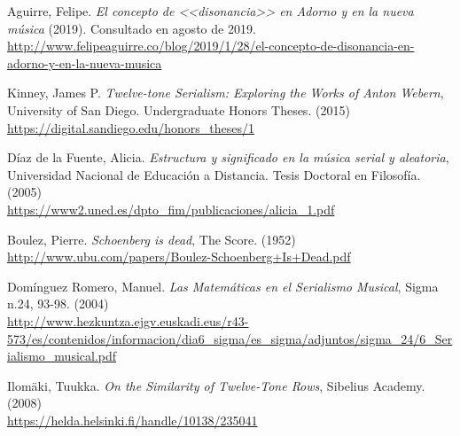 \renewcommand\refname{Referencias}
	\begin{thebibliography}{00}
			

			{ Aguirre, Felipe.} 
			\textit{El concepto de <<disonancia>> en Adorno y en la nueva música} (2019). Consultado en agosto de 2019.
			\\\url{http://www.felipeaguirre.co/blog/2019/1/28/el-concepto-de-disonancia-en-adorno-y-en-la-nueva-musica}
			
			{ Kinney, James P.} 
			\textit{Twelve-tone Serialism: Exploring the Works of Anton Webern},
			University of San Diego.
			Undergraduate Honors Theses.
			(2015)
			\\\url{https://digital.sandiego.edu/honors_theses/1}
			
			{ Díaz de la Fuente, Alicia.} 
			\textit{Estructura y significado en la música serial y aleatoria},
			Universidad Nacional de Educación a Distancia.
			Tesis Doctoral en Filosofía.
			(2005)
			\\\url{https://www2.uned.es/dpto_fim/publicaciones/alicia_1.pdf}		
			
			
			{ Boulez, Pierre.}
			\textit{Schoenberg is dead},
			The Score.
			(1952)
			\\\url{http://www.ubu.com/papers/Boulez-Schoenberg+Is+Dead.pdf}
			
			{ Domínguez Romero, Manuel.} 
			\textit{Las Matemáticas en el Serialismo Musical},
			Sigma n.24, 93-98.
			(2004)
			\\\url{http://www.hezkuntza.ejgv.euskadi.eus/r43-573/es/contenidos/informacion/dia6_sigma/es_sigma/adjuntos/sigma_24/6_Serialismo_musical.pdf}

			
			{ Ilomäki, Tuukka.}
			\textit{On the Similarity of Twelve-Tone Rows},
			Sibelius Academy.
			(2008)
			\\\url{https://helda.helsinki.fi/handle/10138/235041}
			

\end{thebibliography}
